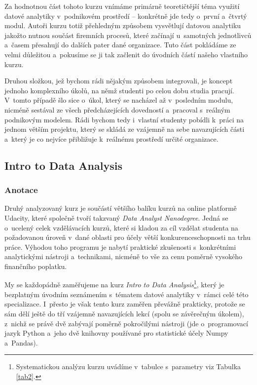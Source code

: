 Za hodnotnou část tohoto kurzu vnímáme primárně teoretičtější téma využití datové analytiky v~podnikovém prostředí -- konkrétně jde tedy o~první a~čtvrtý modul. Autoři kurzu totiž přehledným způsobem vysvětlují datovou analytiku jakožto nutnou součást firemních procesů, které začínají u~samotných jednotlivců a~časem přesahují do dalších pater dané organizace. Tuto část pokládáme ze velmi důležitou a~pokusíme se ji tak začlenit do úvodních částí našeho vlastního kurzu.

Druhou složkou, jež bychom rádi nějakým způsobem integrovali, je koncept jednoho komplexního úkolů, na němž studenti po celou dobu studia pracují. V~tomto případě šlo sice o~úkol, který se nacházel až v~posledním modulu, nicméně sestával ze všech předcházejících dovedností a~pracoval s~reálným podnikovým modelem. Rádi bychom tedy i~vlastní studenty pobídli k~práci na jednom větším projektu, který se skládá ze vzájemně na sebe navazujících části a~který je co nejvíce přibližuje k~reálnému prostředí určité organizace.

\hypertarget{intro-to-data-analysis}{%
\subsection{Intro to Data Analysis}\label{intro-to-data-analysis}}

\hypertarget{anotace-1}{%
\subsubsection{Anotace}\label{anotace-1}}

Druhý analyzovaný kurz je součástí většího balíku kurzů na online platformě Udacity, které společně tvoří takzvaný \emph{Data Analyst Nanodegree}. Jedná se o~ucelený celek vzdělávacích kurzů, které si kladou za cíl vzdělat studenta na požadovanou úroveň v~dané oblasti pro účely větší konkurenceschopnosti na trhu práce. Výhodou toho programu je nabytí praktické zkušenosti s~konkrétními analytickými nástroji a~technikami, nicméně to vše za cenu poměrně vysokého finančního poplatku.

My se každopádně zaměřujeme na kurz \emph{Intro to Data Analysis}\footnote{Systematickou analýzu kurzu uvádíme v~tabulce s~parametry viz Tabulka \ref{tab2}.}, který je bezplatným úvodním seznámením s~tématem datové analytiky v~rámci celé této specializace. I~přesto je však tento kurz zaměřen převážně prakticky, protože se sám dělí ještě do tří vzájemně navazujících lekcí (spolu se závěrečným úkolem), z~nichž se právě dvě zabývají poměrně pokročilými nástroji (jde o~programovací jazyk Python a~jeho dvě knihovny používané pro statistické účely Numpy a~Pandas).

